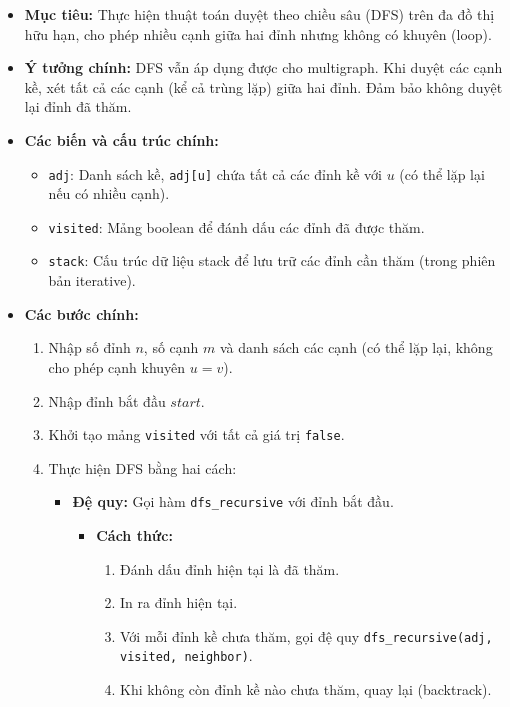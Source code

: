 \documentclass{article}
\begin{document}
\begin{itemize}
    \item \textbf{Mục tiêu:} Thực hiện thuật toán duyệt theo chiều sâu (DFS) trên đa đồ thị hữu hạn, cho phép nhiều cạnh giữa hai đỉnh nhưng không có khuyên (loop).
    \item \textbf{Ý tưởng chính:} DFS vẫn áp dụng được cho multigraph. Khi duyệt các cạnh kề, xét tất cả các cạnh (kể cả trùng lặp) giữa hai đỉnh. Đảm bảo không duyệt lại đỉnh đã thăm.
    \item \textbf{Các biến và cấu trúc chính:}
    \begin{itemize}
        \item \texttt{adj}: Danh sách kề, \texttt{adj[u]} chứa tất cả các đỉnh kề với $u$ (có thể lặp lại nếu có nhiều cạnh).
        \item \texttt{visited}: Mảng boolean để đánh dấu các đỉnh đã được thăm.
        \item \texttt{stack}: Cấu trúc dữ liệu stack để lưu trữ các đỉnh cần thăm (trong phiên bản iterative).
    \end{itemize}
    \item \textbf{Các bước chính:}
    \begin{enumerate}
        \item Nhập số đỉnh $n$, số cạnh $m$ và danh sách các cạnh (có thể lặp lại, không cho phép cạnh khuyên $u = v$).
        \item Nhập đỉnh bắt đầu $start$.
        \item Khởi tạo mảng \texttt{visited} với tất cả giá trị \texttt{false}.
        \item Thực hiện DFS bằng hai cách:
        \begin{itemize}
            \item \textbf{Đệ quy:} Gọi hàm \texttt{dfs\_recursive} với đỉnh bắt đầu.
            \begin{itemize}
                \item \textbf{Cách thức:} 
                \begin{enumerate}
                    \item Đánh dấu đỉnh hiện tại là đã thăm.
                    \item In ra đỉnh hiện tại.
                    \item Với mỗi đỉnh kề chưa thăm, gọi đệ quy \texttt{dfs\_recursive(adj, visited, neighbor)}.
                    \item Khi không còn đỉnh kề nào chưa thăm, quay lại (backtrack).
                \end{enumerate}

\end{itemize}
\end{itemize}
\end{enumerate}
\end{itemize}
\end{document}

